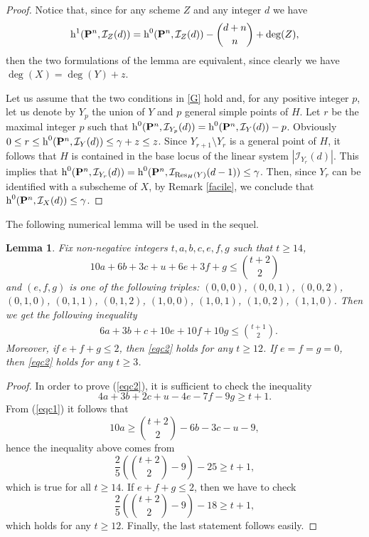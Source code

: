 \documentclass{amsart}
\theoremstyle{plain}
\newtheorem{lemma}[theorem]{Lemma}
\theoremstyle{definition}
\begin{document}
\begin{proof}
Notice that, since for any scheme $Z$ and any integer
$d$ we have
$$\operatorname{h}^1({\bf {P}}^n,{\mathcal{I}}_Z(d))=\operatorname{h}^0({\bf
  {P}}^n,{\mathcal{I}}_Z(d))-\binom{d+n}{n}+\deg(Z),$$
then the two formulations of the lemma are equivalent, since clearly
we have $\deg(X)=\deg(Y)+z$.

Let us assume that the two conditions in \eqref{G} hold and,
for any positive integer $p$, let us denote by $Y_p$ the union of $Y$ and
$p$ general simple points of $H$.
Let $r$ be the maximal integer $p$ such that
$\operatorname{h}^0({\bf {P}}^n,{\mathcal{I}}_{Y_p}(d))=\operatorname{h}^0({\bf {P}}^n,{\mathcal{I}}_{Y}(d))-p$.
Obviously $0\leq r \leq \operatorname{h}^0({\bf {P}}^n,{\mathcal{I}}_{Y}(d))\leq \gamma + z
\le z$.
Since $Y_{r+1}\setminus Y_r$ is a general point of $H$, it follows that $H$
is contained in the base locus of the linear system $|{\mathcal{I}}_{Y_r}(d)|$.
This implies that
$\operatorname{h}^0({\bf {P}}^n,{\mathcal{I}}_{Y_r}(d))=\operatorname{h}^0({\bf
  {P}}^n,{\mathcal{I}}_{\operatorname{Res}_H(Y)}(d-1))\le \gamma$.
Then, since $Y_r$ can be identified with a subscheme of $X$, by Remark
\ref{facile}, we conclude that $\operatorname{h}^0({\bf {P}}^n,{\mathcal{I}}_X(d))\leq \gamma$.
\end{proof}

The following numerical lemma will be used in the sequel.
\begin{lemma}\label{c1}
Fix non-negative integers $t, a,b,c,e,f,g$ such that $t \ge 14$,
\begin{equation}\label{eqc1}
10a +6b+3c +u +6e+3f +g \le \binom{t+2}{2}
\end{equation}
and $(e,f,g)$ is one of the following triples: $(0,0,0)$,
$(0,0,1)$, $(0,0,2)$, $(0,1,0)$, $(0,1,1)$, $(0,1,2)$, $(1,0,0)$,
$(1,0,1)$, $(1,0,2)$, $(1,1,0)$. Then we get the following
inequality
\begin{align}
\label{eqc2} &6a+3b+c+ 10e +10f + 10g \le \binom{t+1}{2}.
\end{align}
Moreover, if $e+f+g\le2$, then
\eqref{eqc2} holds for any $t\geq12$.
If $e=f=g=0$, then
\eqref{eqc2} holds for any $t\ge 3$.
\end{lemma}

\begin{proof}
In order to prove (\ref{eqc2}),
it is sufficient to check the inequality
$$4a +3b+2c +u -4e-7f-9g \ge t+1.$$
From (\ref{eqc1}) it follows that
$$10a \ge \binom{t+2}{2}-6b-3c -u -9,$$
hence the inequality above comes from
$$\frac{2}{5}\left(\binom{t+2}{2} -9\right) -25 \ge t+1,$$
which is true for all $t \ge 14$.
If $e+f+g\le2$, then we have to check
$$\frac{2}{5}\left(\binom{t+2}{2} -9\right) -18 \ge t+1,$$
which holds for any $t\geq12$.
Finally, the last statement follows easily.
\end{proof}
\end{document}
